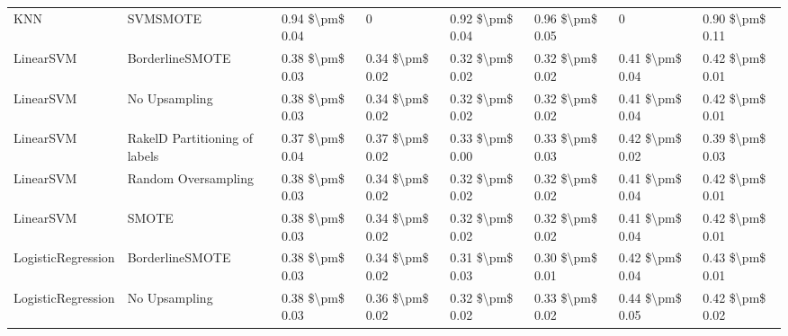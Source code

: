 \begin{tabular}{llllllll}
                            KNN &                      SVMSMOTE & 0.94 \$\textbackslash pm\$ 0.04 &                         0 &       0.92 \$\textbackslash pm\$ 0.04 &        0.96 \$\textbackslash pm\$ 0.05 &                                       0 & 0.90 \$\textbackslash pm\$ 0.11 \\
                      LinearSVM &               BorderlineSMOTE & 0.38 \$\textbackslash pm\$ 0.03 &           0.34 \$\textbackslash pm\$ 0.02 &       0.32 \$\textbackslash pm\$ 0.02 &        0.32 \$\textbackslash pm\$ 0.02 &                         0.41 \$\textbackslash pm\$ 0.04 & 0.42 \$\textbackslash pm\$ 0.01 \\
                      LinearSVM &                 No Upsampling & 0.38 \$\textbackslash pm\$ 0.03 &           0.34 \$\textbackslash pm\$ 0.02 &       0.32 \$\textbackslash pm\$ 0.02 &        0.32 \$\textbackslash pm\$ 0.02 &                         0.41 \$\textbackslash pm\$ 0.04 & 0.42 \$\textbackslash pm\$ 0.01 \\
                      LinearSVM & RakelD Partitioning of labels & 0.37 \$\textbackslash pm\$ 0.04 &           0.37 \$\textbackslash pm\$ 0.02 &       0.33 \$\textbackslash pm\$ 0.00 &        0.33 \$\textbackslash pm\$ 0.03 &                         0.42 \$\textbackslash pm\$ 0.02 & 0.39 \$\textbackslash pm\$ 0.03 \\
                      LinearSVM &           Random Oversampling & 0.38 \$\textbackslash pm\$ 0.03 &           0.34 \$\textbackslash pm\$ 0.02 &       0.32 \$\textbackslash pm\$ 0.02 &        0.32 \$\textbackslash pm\$ 0.02 &                         0.41 \$\textbackslash pm\$ 0.04 & 0.42 \$\textbackslash pm\$ 0.01 \\
                      LinearSVM &                         SMOTE & 0.38 \$\textbackslash pm\$ 0.03 &           0.34 \$\textbackslash pm\$ 0.02 &       0.32 \$\textbackslash pm\$ 0.02 &        0.32 \$\textbackslash pm\$ 0.02 &                         0.41 \$\textbackslash pm\$ 0.04 & 0.42 \$\textbackslash pm\$ 0.01 \\
             LogisticRegression &               BorderlineSMOTE & 0.38 \$\textbackslash pm\$ 0.03 &           0.34 \$\textbackslash pm\$ 0.02 &       0.31 \$\textbackslash pm\$ 0.03 &        0.30 \$\textbackslash pm\$ 0.01 &                         0.42 \$\textbackslash pm\$ 0.04 & 0.43 \$\textbackslash pm\$ 0.01 \\
             LogisticRegression &                 No Upsampling & 0.38 \$\textbackslash pm\$ 0.03 &           0.36 \$\textbackslash pm\$ 0.02 &       0.32 \$\textbackslash pm\$ 0.02 &        0.33 \$\textbackslash pm\$ 0.02 &                         0.44 \$\textbackslash pm\$ 0.05 & 0.42 \$\textbackslash pm\$ 0.02 \\

\end{tabular}
